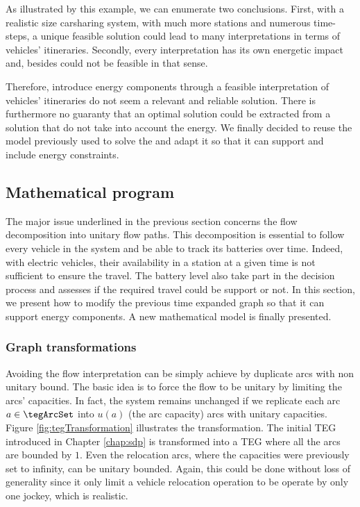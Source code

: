 \begin{bibunit}[ieeetr]
\medskip
As illustrated by this example, we can enumerate two conclusions.
First, with a realistic size carsharing system, \ie with much more stations and numerous time-steps, a unique feasible solution could lead to many interpretations in terms of vehicles' itineraries.
Secondly, every interpretation has its own energetic impact and, besides could not be feasible in that sense. 

Therefore, introduce energy components through a feasible interpretation of vehicles' itineraries do not seem a relevant and reliable solution.
There is furthermore no guaranty that an optimal solution could be extracted from a solution that do not take into account the energy.
We finally decided to reuse the model previously used to solve the {\SLP} and adapt it so that it can support and include energy constraints.


\subsection{Mathematical program}
The major issue underlined in the previous section concerns the flow decomposition into unitary flow paths.
This decomposition is essential to follow every vehicle in the system and be able to track its batteries over time.
Indeed, with electric vehicles, their availability in a station at a given time is not sufficient to ensure the travel.
The battery level also take part in the decision process and assesses if the required travel could be support or not.
In this section, we present how to modify the previous time expanded graph so that it can support energy components.
A new mathematical model is finally presented.

\subsubsection{Graph transformations} \label{sec:graphTransformations}
Avoiding the flow interpretation can be simply achieve by duplicate arcs with non unitary bound.
The basic idea is to force the flow to be unitary by limiting the arcs' capacities.
In fact, the system remains unchanged if we replicate each arc $a \in \tegArcSet$ into $u(a)$ (the arc capacity) arcs with unitary capacities.
Figure \ref{fig:tegTransformation} illustrates the transformation.
The initial TEG introduced in Chapter \ref{chap:sdp} is transformed into a TEG where all the arcs are bounded by $1$.
Even the relocation arcs, where the capacities were previously set to infinity, can be unitary bounded.
Again, this could be done without loss of generality since it only limit a vehicle relocation operation to be operate by only one jockey, which is realistic.


\end{bibunit}
